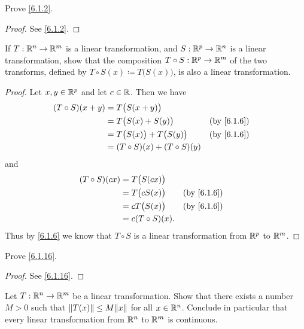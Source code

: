 \exercisesection

\begin{ex}\label{ex:6.1.1}
  Prove \cref{6.1.2}.
\end{ex}

\begin{proof}
  See \cref{6.1.2}.
\end{proof}

\begin{ex}\label{ex:6.1.2}
  If \(T : \mathbb{R}^n \to \mathbb{R}^m\) is a linear transformation, and \(S : \mathbb{R}^p \to \mathbb{R}^n\) is a linear transformation, show that the composition \(T \circ S : \mathbb{R}^p \to \mathbb{R}^m\) of the two transforms, defined by \(T \circ S(x) \coloneqq T\big(S(x)\big)\), is also a linear transformation.
\end{ex}

\begin{proof}
  Let \(x, y \in \mathbb{R}^p\) and let \(c \in \mathbb{R}\).
  Then we have
  \begin{align*}
    (T \circ S)(x + y) & = T\big(S(x + y)\big)                               \\
                       & = T\big(S(x) + S(y)\big)            &  & \by{6.1.6} \\
                       & = T\big(S(x)\big) + T\big(S(y)\big) &  & \by{6.1.6} \\
                       & = (T \circ S)(x) + (T \circ S)(y)
  \end{align*}
  and
  \begin{align*}
    (T \circ S)(cx) & = T\big(S(cx)\big)                  \\
                    & = T\big(c S(x)\big) &  & \by{6.1.6} \\
                    & = c T\big(S(x)\big) &  & \by{6.1.6} \\
                    & = c (T \circ S)(x).
  \end{align*}
  Thus by \cref{6.1.6} we know that \(T \circ S\) is a linear transformation from \(\mathbb{R}^p\) to \(\mathbb{R}^m\).
\end{proof}

\begin{ex}\label{ex:6.1.3}
  Prove \cref{6.1.16}.
\end{ex}

\begin{proof}
  See \cref{6.1.16}.
\end{proof}

\begin{ex}\label{ex:6.1.4}
  Let \(T : \mathbb{R}^n \to \mathbb{R}^m\) be a linear transformation.
  Show that there exists a number \(M > 0\) such that \(\norm*{T(x)} \leq M \norm*{x}\) for all \(x \in \mathbb{R}^n\).
  Conclude in particular that every linear transformation from \(\mathbb{R}^n\) to \(\mathbb{R}^m\) is continuous.
\end{ex}

